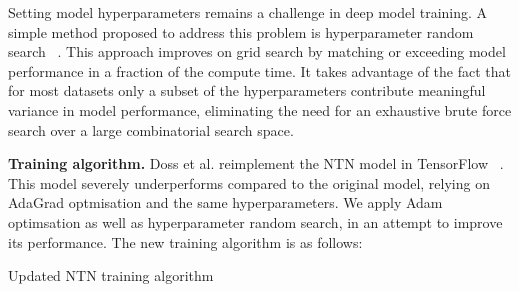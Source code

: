 \noindent Setting model hyperparameters remains a challenge in deep model training. A simple method proposed to address this problem is hyperparameter random search \unskip ~\citep{bergstra2012random}. This approach improves on grid search by matching or exceeding model performance in a fraction of the compute time. It takes advantage of the fact that for most datasets only a subset of the hyperparameters contribute meaningful variance in model performance, eliminating the need for an exhaustive brute force search over a large combinatorial search space. \par

\noindent \textbf{Training algorithm.} Doss et al. reimplement the NTN model in TensorFlow \unskip ~\citep{abadi2016tensorflow}. This model severely underperforms compared to the original model, relying on AdaGrad optmisation and the same hyperparameters. We apply Adam optimsation as well as hyperparameter random search, in an attempt to improve its performance. The new training algorithm is as follows: 

\medskip

\begin{algorithm}[H]
	\caption{Updated NTN training algorithm}
\end{algorithm} 

